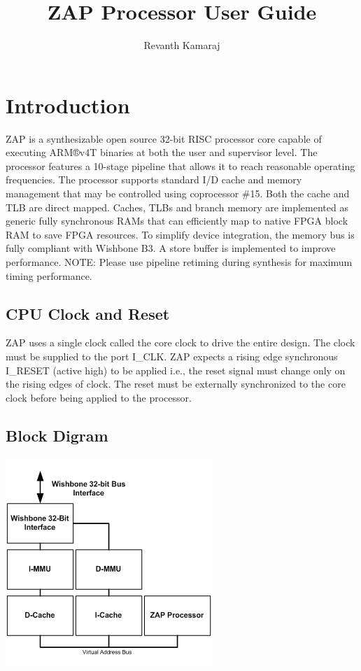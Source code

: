 \documentclass[10pt]{article}
\title{ZAP Processor User Guide}
\author{Revanth Kamaraj}
\begin{document}
\lstset{language=Perl}
\maketitle

\section{Introduction}

ZAP is a synthesizable open source 32-bit RISC processor core capable of 
executing ARM®v4T binaries at both the user and supervisor level. The processor 
features a 10-stage pipeline that allows it to reach reasonable operating 
frequencies. The processor supports standard I/D cache and memory management 
that may be controlled using coprocessor \#15. Both the cache and TLB are direct 
mapped. Caches, TLBs and branch memory are implemented as generic fully 
synchronous RAMs that can efficiently map to native FPGA block RAM to save FPGA 
resources. To simplify  device integration, the memory bus is fully compliant 
with Wishbone B3. A store buffer is implemented to improve performance.
\linebreak
\linebreak
NOTE: Please use pipeline retiming during synthesis for maximum timing performance. 

\subsection{CPU Clock and Reset}
ZAP uses a single clock called the core clock to drive the entire design. The 
clock must be supplied to the port I\_CLK. ZAP expects a rising edge 
synchronous I\_RESET (active high) to be applied i.e., 
the reset signal must change only on the rising edges of clock. The reset 
must be externally synchronized to the core clock before being applied to 
the processor.

\subsection{Block Digram}
\includegraphics{images/image004.png}
\end{document}
